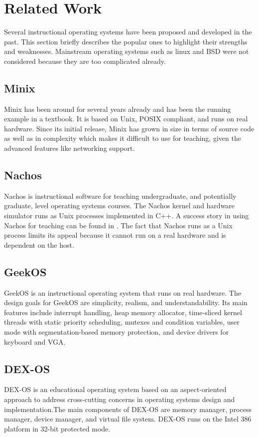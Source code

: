 \documentclass{acm_proc_article-sp}
\begin{document}
\section{Related Work}
Several instructional operating systems have been proposed and developed in 
the past\cite{anderson:survey}. This section briefly describes the popular ones to highlight
their strengths and weaknesses. Mainstream operating systems such as linux and
BSD were not considered because they are too complicated already.

\subsection{Minix}
Minix\cite{tanenbaum:minix} has been around for several years already and has 
been the running example in a textbook\cite{tanenbaum:osdai}. It is based
on Unix, POSIX compliant, and runs on real hardware. Since its initial release,
Minix has grown in size in terms of source code as well as in complexity 
which makes it difficult to use for teaching, given the advanced features like 
networking support.

\subsection{Nachos}
Nachos\cite{christopher:nachos} is instructional software for teaching 
undergraduate, and potentially graduate, level operating systems courses.
The Nachos kernel and hardware simulator runs as Unix processes implemented
in C++. A success story in using Nachos for teaching can be found in 
\cite{gary:nachos}. The fact that Nachos runs as a Unix process limits 
its appeal because it cannot run on a real hardware and is dependent on the
host.

\subsection{GeekOS}
GeekOS\cite{hovemeyer:geekos} is an instructional operating system that
runs on real hardware. The design goals for GeekOS are simplicity, realism,
and understandability. Its main features include interrupt handling, 
heap memory allocator, time-sliced kernel threads with static priority
scheduling, mutexes and condition variables, user mode with segmentation-based
memory protection, and device drivers for keyboard and VGA.


\subsection{DEX-OS}
DEX-OS\cite{dayo:dexos,dexos:site} is an educational operating system based on
an aspect-oriented approach to address cross-cutting concerns in operating 
systems design and implementation.The main components of DEX-OS are memory 
manager, process manager, device manager, and virtual file system. DEX-OS runs
on the Intel 386 platform in 32-bit protected mode.
\end{document}

